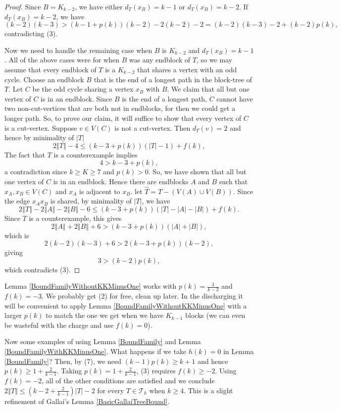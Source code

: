 \documentclass[12pt]{article}
\theoremstyle{plain}
\theoremstyle{definition}
\theoremstyle{remark}
\newcommand{\fancy}[1]{\mathcal{#1}}
\newcommand{\T}{\fancy{T}}
\newcommand{\card}[1]{\left|#1\right|}
\newcommand{\size}[1]{\left\Vert#1\right\Vert}
\newcommand{\parens}[1]{\left( #1 \right)}
\begin{document}
\begin{proof}
	Since $B=K_{k-2}$, we have either $d_T(x_B) = k - 1$ or $d_T(x_B) = k-2$. If $d_T(x_B) = k - 2$, we have
	\[(k-2)(k-3) > (k-1 + p(k))(k-2) - 2(k-2) - 2 = (k-2)(k-3) - 2 + (k-2)p(k),\]
	contradicting (3).
	
	Now we need to handle the remaining case when $B$ is $K_{k-2}$ and $d_T(x_B) = k - 1$.  All of the above cases were for when $B$ was any endblock of $T$, 
	so we may assume that every endblock of $T$ is a $K_{k-2}$ that shares a vertex with an odd cycle.  Choose an endblock $B$ that is the end of a longest path in the block-tree of $T$.  
	Let $C$ be the odd cycle sharing a vertex $x_B$ with $B$.  We claim that all but one vertex of $C$ is in an endblock.  Since $B$ is the end of a longest path, $C$ cannot have two non-cut-vertices that are both not in endblocks, for then we could
	get a longer path.  So, to prove our claim, it will suffice to show that every vertex of $C$ is a cut-vertex.  Suppose $v \in V(C)$ is not a cut-vertex.  Then $d_T(v) = 2$ and hence by minimality of $\card{T}$
	\[2\size{T} - 4 \le (k-3 + p(k))\parens{\card{T} - 1} + f(k),\]
	The fact that $T$ is a counterexample implies
	\[4 > k-3 + p(k),\]
	a contradiction since $k \ge K \ge 7$ and $p(k) > 0$.  So, we have shown that all but one vertex of $C$ is in an endblock.  Hence there are endblocks $A$ and $B$ such that $x_A, x_B \in V(C)$ and $x_A$ is adjacent to $x_B$.  let $\hat{T} = T - \parens{V(A) \cup V(B)}$.  Since the edge $x_Ax_B$ is shared, by minimality of $\card{T}$, we have
	\[2\size{T} - 2\size{A} - 2\size{B} - 6 \le (k-3 + p(k))\parens{\card{T} - \card{A} - \card{B}} + f(k).\]
	Since $T$ is a counterexample, this gives
	\[2\size{A} + 2\size{B} + 6 > (k-3 + p(k))(\card{A} + \card{B}),\]
	which is
	\[2(k-2)(k-3) + 6 > 2(k-3 + p(k))(k-2),\]
	giving
	\[3 > (k-2)p(k),\]
	which contradicts (3).
\end{proof}

Lemma \ref{BoundFamilyWithoutKKMinusOne} works with $p(k) = \frac{3}{k-2}$ and $f(k) = -3$.  We probably get (2) for free, clean up later.  In the discharging it will be convenient to apply Lemma \ref{BoundFamilyWithoutKKMinusOne} with a larger $p(k)$ to match the one we get when we have $K_{k-1}$ blocks (we can even be wasteful with the charge and use $f(k) = 0$).

Now some examples of using Lemma \ref{BoundFamily} and Lemma \ref{BoundFamilyWithKKMinusOne}.  What happens if we take $h(k) = 0$ in Lemma \ref{BoundFamily}?  Then, by (7), we need $(k-1)p(k) \ge k + 1$ and hence $p(k) \ge 1 + \frac{2}{k-1}$.  Taking $p(k) = 1 + \frac{2}{k-1}$, (3) requires $f(k) \ge -2$.  Using $f(k) = -2$, all of the other conditions are satisfied and we conclude $2\size{T} \le \parens{k-2 + \frac{2}{k-1}}\card{T} - 2$ for every $T \in \T_k$ when $k \ge 4$.  This is a slight refinement of Gallai's Lemma \ref{BasicGallaiTreeBound}.
\end{document}
